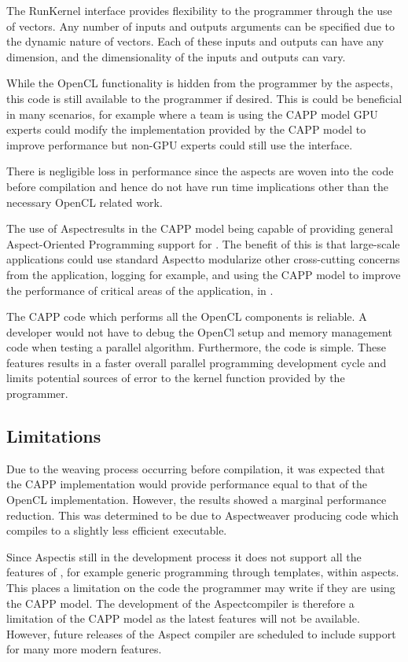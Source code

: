 \documentclass{sig-alternate-05-2015}
\begin{document}
The RunKernel interface provides flexibility to the programmer through the use
of vectors. Any number of inputs and outputs arguments can be specified due to
the dynamic nature of vectors. Each of these inputs and outputs can have any 
dimension, and the dimensionality of the inputs and outputs can vary.

While the OpenCL functionality is hidden from the programmer by the aspects,
this code is still available to the programmer if desired. This is could be
beneficial in many scenarios, for example where a team is using the
CAPP model GPU experts could modify the implementation provided by the
CAPP model to improve performance but non-GPU experts could still use
the \CPP interface.  

There is negligible loss in performance since the aspects are woven into the
\CPP code before compilation and hence do not have run time implications other
than the necessary OpenCL related work.

The use of Aspect\CPP results in the CAPP model being capable of
providing general Aspect-Oriented Programming support for \CPP. The benefit of this is that
large-scale applications could use standard Aspect\CPP to modularize other
cross-cutting concerns from the \CPP application, logging for example, and using the
CAPP model to improve the performance of critical areas of the
application, in \CPP.

The CAPP code which performs all the OpenCL components is reliable.
A developer would not have to debug the OpenCl setup and memory management code
when testing a parallel algorithm. Furthermore, the \CPP code is simple. These
features results in a faster overall parallel programming development cycle and
limits potential sources of error to the kernel function provided by the
programmer.

\subsection{Limitations}

Due to the weaving process occurring before compilation, it was expected that
the CAPP implementation would provide performance equal to that of the
OpenCL implementation. However, the results showed a marginal performance
reduction. This was determined to be due to Aspect\CPP weaver producing code
which compiles to a slightly less efficient executable. 

Since Aspect\CPP is still in the development process it does not support all 
the features of \CPP, for example generic programming through templates, within
aspects. 
This places a limitation on the \CPP code  the programmer may write if they 
are using the CAPP model. The development of the Aspect\CPP compiler 
is therefore a limitation of the CAPP model as the latest \CPP 
features will not be available. However, future releases of the Aspect\CPP
compiler are scheduled to include support for many more modern \CPP features.
\end{document}
